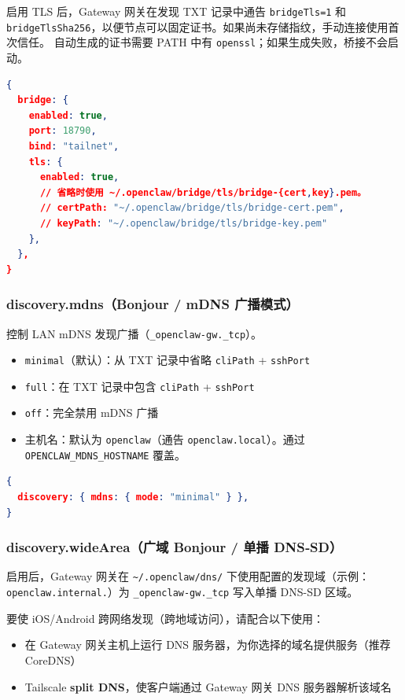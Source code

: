 启用 TLS 后，Gateway 网关在发现 TXT 记录中通告 \texttt{bridgeTls=1} 和 \texttt{bridgeTlsSha256}，以便节点可以固定证书。如果尚未存储指纹，手动连接使用首次信任。
自动生成的证书需要 PATH 中有 \texttt{openssl}；如果生成失败，桥接不会启动。

\begin{lstlisting}[language=json]
{
  bridge: {
    enabled: true,
    port: 18790,
    bind: "tailnet",
    tls: {
      enabled: true,
      // 省略时使用 ~/.openclaw/bridge/tls/bridge-{cert,key}.pem。
      // certPath: "~/.openclaw/bridge/tls/bridge-cert.pem",
      // keyPath: "~/.openclaw/bridge/tls/bridge-key.pem"
    },
  },
}
\end{lstlisting}


\subsubsection{discovery.mdns（Bonjour / mDNS 广播模式）}


控制 LAN mDNS 发现广播（\texttt{\_openclaw-gw.\_tcp}）。

\begin{itemize}
  \item \texttt{minimal}（默认）：从 TXT 记录中省略 \texttt{cliPath} + \texttt{sshPort}
  \item \texttt{full}：在 TXT 记录中包含 \texttt{cliPath} + \texttt{sshPort}
  \item \texttt{off}：完全禁用 mDNS 广播
  \item 主机名：默认为 \texttt{openclaw}（通告 \texttt{openclaw.local}）。通过 \texttt{OPENCLAW\_MDNS\_HOSTNAME} 覆盖。
\end{itemize}


\begin{lstlisting}[language=json]
{
  discovery: { mdns: { mode: "minimal" } },
}
\end{lstlisting}


\subsubsection{discovery.wideArea（广域 Bonjour / 单播 DNS‑SD）}


启用后，Gateway 网关在 \texttt{\textasciitilde{}/.openclaw/dns/} 下使用配置的发现域（示例：\texttt{openclaw.internal.}）为 \texttt{\_openclaw-gw.\_tcp} 写入单播 DNS-SD 区域。

要使 iOS/Android 跨网络发现（跨地域访问），请配合以下使用：

\begin{itemize}
  \item 在 Gateway 网关主机上运行 DNS 服务器，为你选择的域名提供服务（推荐 CoreDNS）
  \item Tailscale \textbf{split DNS}，使客户端通过 Gateway 网关 DNS 服务器解析该域名
\end{itemize}


